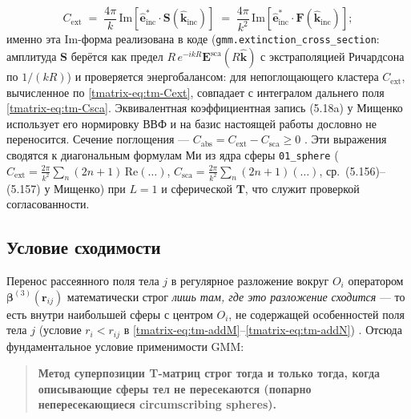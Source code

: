 \documentclass[11pt,a4paper]{article}
\begin{document}
\begin{equation}
C_{\mathrm{ext}} \;=\;\frac{4\pi}{k}\,\mathrm{Im}\!\left[\hat{\bm{e}}^{*}_{\mathrm{inc}}\cdot\bm{S}(\hat{\bm{k}}_{\mathrm{inc}})\right]
\;=\;\frac{4\pi}{k^2}\,\mathrm{Im}\!\left[\hat{\bm{e}}^{*}_{\mathrm{inc}}\cdot\bm{F}(\hat{\bm{k}}_{\mathrm{inc}})\right];
\label{tmatrix-eq:tm-Cext}
\end{equation}
именно эта $\mathrm{Im}$-форма реализована в коде (\texttt{gmm.extinction\_cross\_section}: амплитуда $\bm{S}$ берётся как предел $R\,e^{-ikR}\bm{E}^{\mathrm{sca}}(R\hat{\bm{k}})$ с экстраполяцией Ричардсона по $1/(kR)$) и проверяется энергобалансом: для непоглощающего кластера $C_{\mathrm{ext}}$, вычисленное по \eqref{tmatrix-eq:tm-Cext}, совпадает с интегралом дальнего поля \eqref{tmatrix-eq:tm-Csca}. Эквивалентная коэффициентная запись (5.18a) у Мищенко \cite{mishchenko2002} использует его нормировку ВВФ и на базис настоящей работы дословно не переносится. Сечение поглощения --- $C_{\mathrm{abs}}=C_{\mathrm{ext}}-C_{\mathrm{sca}}\ge 0$ \cite{bohren1983,mishchenko2002}. Эти выражения сводятся к диагональным формулам Ми из ядра сферы \texttt{01\_sphere} ($C_{\mathrm{ext}}=\tfrac{2\pi}{k^2}\sum_n(2n+1)\,\mathrm{Re}(\dots)$, $C_{\mathrm{sca}}=\tfrac{2\pi}{k^2}\sum_n(2n+1)(\dots)$, ср.\ (5.156)--(5.157) у Мищенко) при $L=1$ и сферической $\mathbf{T}$, что служит проверкой согласованности.

\subsection{Условие сходимости}
\label{tmatrix-sec:tm-conv}

Перенос рассеянного поля тела $j$ в регулярное разложение вокруг $O_i$ оператором $\bm{\beta}^{(3)}(\bm{r}_{ij})$ математически строг \emph{лишь там, где это разложение сходится} --- то есть внутри наибольшей сферы с центром $O_i$, не содержащей особенностей поля тела $j$ (условие $r_i<r_{ij}$ в \eqref{tmatrix-eq:tm-addM}--\eqref{tmatrix-eq:tm-addN}) \cite{stein1961,cruzan1962,mishchenko2002}. Отсюда фундаментальное условие применимости GMM:

\begin{quote}
\textbf{Метод суперпозиции T-матриц строг тогда и только тогда, когда описывающие сферы тел не пересекаются (попарно непересекающиеся circumscribing spheres).}
\end{quote}
\end{document}
